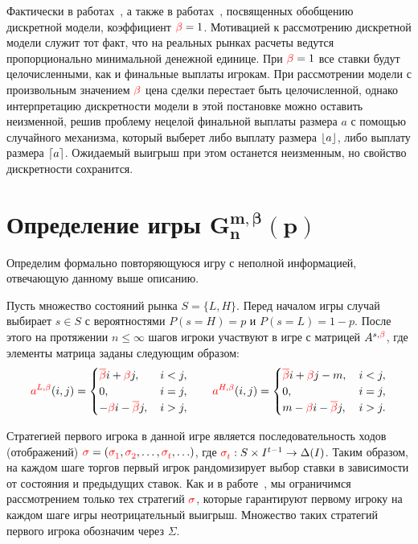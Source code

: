 {Фактически в работах~\cite{domansky07, demeyer05}, а также в работах~\cite{domansky11, domansky13, domansky14}, посвященных обобщению дискретной модели, коэффициент $\textcolor{red}{\beta} = 1$.
Мотивацией к рассмотрению дискретной модели служит тот факт, что на реальных рынках расчеты ведутся пропорционально минимальной денежной единице.
При $\textcolor{red}{\beta} = 1$ все ставки будут целочисленными, как и финальные выплаты игрокам.
При рассмотрении модели с произвольным значением $\textcolor{red}{\beta}$ цена сделки перестает быть целочисленной, однако интерпретацию дискретности модели в этой постановке можно оставить неизменной, решив проблему нецелой финальной выплаты размера $a$ с помощью случайного механизма, который выберет либо выплату размера $\lfloor a \rfloor$, либо выплату размера $\lceil a \rceil$.
Ожидаемый выигрыш при этом останется неизменным, но свойство дискретности сохранится.

\section{Определение игры $\mathbf{G^{m,\beta}_n(p)}$}\label{ch1:formal-def}

Определим формально повторяющуюся игру с неполной информацией, отвечающую данному выше описанию. 

Пусть множество состояний рынка $S = \{L, H\}$. Перед началом игры случай выбирает $s \in S $ с вероятностями $P(s=H) = p$ и $P(s=L) = 1 - p$.
После этого на протяжении $n \leq \infty$ шагов игроки участвуют в игре с матрицей $A^{s,\textcolor{red}{\beta}}$, где элементы матрица заданы следующим образом:
\begin{equation*}
  \as[L](i, j) = \begin{cases}
    \DCo i + \Co j, &\, i < j, \\
    0, &\, i = j, \\
    -\Co i - \DCo j, &\, i > j,
  \end{cases}
  \qquad
  \as[H](i, j) = \begin{cases}
    \DCo i + \Co j - m, &\, i < j, \\
    0, &\, i = j, \\
    m - \Co i - \DCo j, &\, i > j.
  \end{cases}
\end{equation*}

Стратегией первого игрока в данной игре является последовательность ходов (отображений) 
$\sigmar = (\sigmas{1}, \sigmas{2}, \ldots, \sigmas{t}, \ldots)$, где 
$\sigmas{t}: S \times I^{t-1} \rightarrow \Delta(I)$.
Таким образом, на каждом шаге торгов первый игрок рандомизирует выбор ставки в зависимости от состояния и предыдущих ставок.
Как и в работе~\cite{domansky07}, мы ограничимся рассмотрением только тех стратегий $\textcolor{red}{\sigma}$, которые гарантируют первому игроку на каждом шаге игры неотрицательный выигрыш.
Множество таких стратегий первого игрока обозначим через $\Sigma$.

}
